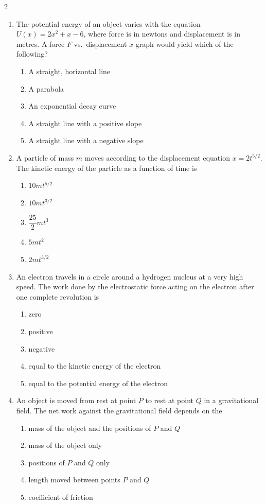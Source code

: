 {\begin{multicols*}{2}
\begin{enumerate}[leftmargin=12pt,itemsep=4pt]
    \item The potential energy of an object varies with the equation
      $U(x)=2x^2+x-6$, where force is in newtons and displacement is in metres.
      A force $F$ vs.\ displacement $x$ graph would yield which of the
      following?
      \begin{enumerate}
      \item A straight, horizontal line
      \item A parabola
      \item An exponential decay curve
      \item A straight line with a positive slope
      \item A straight line with a negative slope
      \end{enumerate}
    
    \item A particle of mass $m$ moves according to the displacement equation
      $x=2t^{5/2}$. The kinetic energy of the particle as a function of time is
      \begin{enumerate}
      \item $10mt^{5/2}$
      \item $10mt^{3/2}$
      \item $\dfrac{25}2mt^3$
      \item $5mt^2$
      \item $2mt^{3/2}$
      \end{enumerate}
      
    \item An electron travels in a circle around a hydrogen nucleus at a very
      high speed. The work done by the electrostatic force acting on the
      electron after one complete revolution is
      \begin{enumerate}
      \item zero
      \item positive
      \item negative
      \item equal to the kinetic energy of the electron
      \item equal to the potential energy of the electron
      \end{enumerate}
    
    \item An object is moved from rest at point $P$ to rest at point $Q$ in a
      gravitational field. The net work against the gravitational field depends
      on the
      \begin{enumerate}
      \item mass of the object and the positions of $P$ and $Q$
      \item mass of the object only
      \item positions of $P$ and $Q$ only
      \item length moved between points $P$ and $Q$
      \item coefficient of friction
      \end{enumerate}
  

\end{enumerate}
\end{multicols*}}
